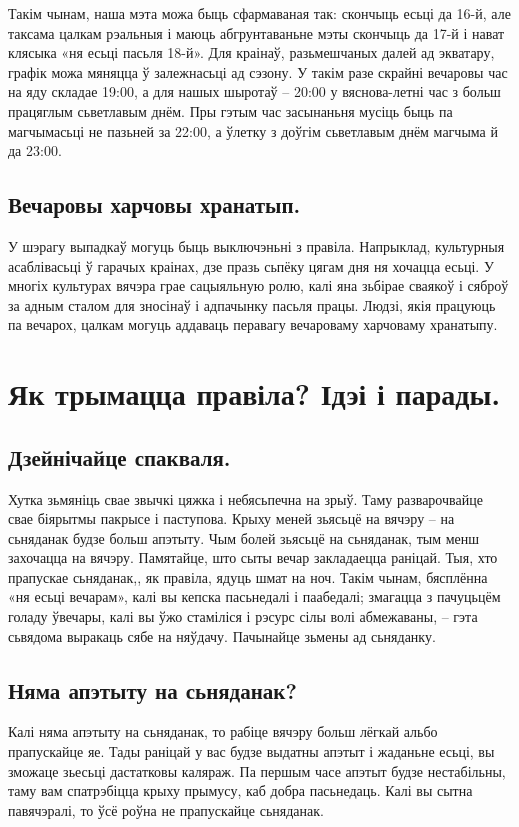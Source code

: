 Такім чынам, наша мэта можа быць сфармаваная так: скончыць есьці да 16-й, але таксама цалкам рэальныя і маюць абгрунтаваньне мэты скончыць да 17-й і нават клясыка «ня есьці пасьля 18-й». Для краінаў, разьмешчаных далей ад экватару, графік можа мяняцца ў залежнасьці ад сэзону. У такім разе скрайні вечаровы час на яду складае 19:00, а для нашых шыротаў – 20:00 у вяснова-летні час з больш працяглым сьветлавым днём. Пры гэтым час засынаньня мусіць быць па магчымасьці не пазьней за 22:00, а ўлетку з доўгім сьветлавым днём магчыма й да 23:00.

\subsection{Вечаровы харчовы хранатып.}
У шэрагу выпадкаў могуць быць выключэньні з правіла. Напрыклад, культурныя асаблівасьці ў гарачых краінах, дзе празь сьпёку цягам дня ня хочацца есьці. У многіх культурах вячэра грае сацыяльную ролю, калі яна зьбірае сваякоў і сяброў за адным сталом для зносінаў і адпачынку пасьля працы. Людзі, якія працуюць па вечарох, цалкам могуць аддаваць перавагу вечароваму харчоваму хранатыпу.

\section{Як трымацца правіла? Ідэі і парады.}

\subsection{Дзейнічайце спакваля.}
Хутка зьмяніць свае звычкі цяжка і небясьпечна на зрыў. Таму разварочвайце свае біярытмы пакрысе і паступова. Крыху меней зьясьцё на вячэру – на сьняданак будзе больш апэтыту. Чым болей зьясьцё на сьняданак, тым менш захочацца на вячэру. Памятайце, што сыты вечар закладаецца раніцай. Тыя, хто прапускае сьняданак,, як правіла, ядуць шмат на ноч. Такім чынам, бясплённа «ня есьці вечарам», калі вы кепска пасьнедалі і паабедалі; змагацца з пачуцьцём голаду ўвечары, калі вы ўжо стаміліся і рэсурс сілы волі абмежаваны, – гэта сьвядома выракаць сябе на няўдачу. Пачынайце зьмены ад сьняданку.

\subsection{Няма апэтыту на сьняданак?}
Калі няма апэтыту на сьняданак, то рабіце вячэру больш лёгкай альбо прапускайце яе. Тады раніцай у вас будзе выдатны апэтыт і жаданьне есьці, вы зможаце зьесьці дастатковы каляраж. Па першым часе апэтыт будзе нестабільны, таму вам спатрэбіцца крыху прымусу, каб добра пасьнедаць. Калі вы сытна павячэралі, то ўсё роўна не прапускайце сьняданак.

